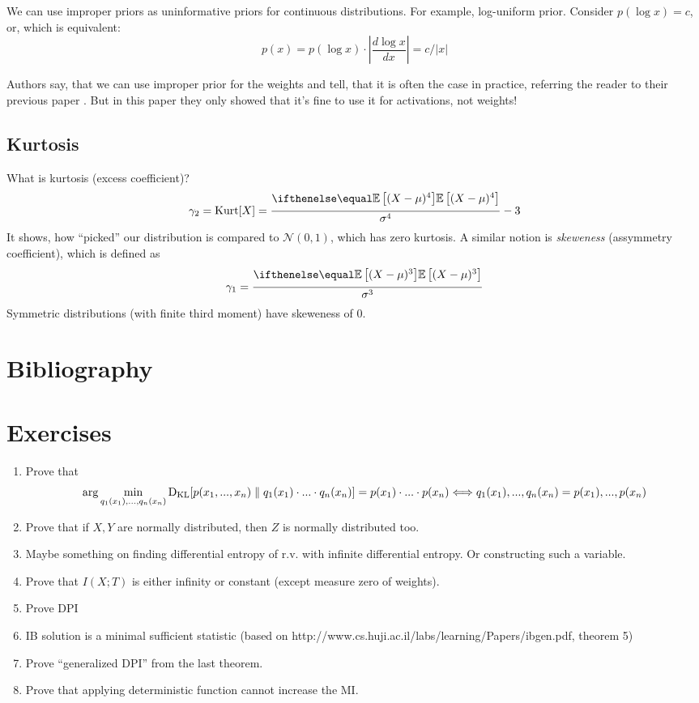 \documentclass{article}
\begin{document}
We can use improper priors as uninformative priors for continuous distributions.
For example, log-uniform prior.
Consider $p(\log x) = c$, or, which is equivalent:
\[
p(x) = p(\log x) \cdot \left|\frac{d\log x}{dx}\right| = c / |x|
\]

Authors say, that we can use improper prior for the weights and tell, that it is often the case in practice, referring the reader to their previous paper \cite{Information_Dropout}.
But in this paper they only showed that it's fine to use it for activations, not weights!

\subsection*{Kurtosis}
What is kurtosis (excess coefficient)?
\[
\gamma_2 = \text{Kurt}[X] = \frac{\expect{(X - \mu)^4}}{\sigma^4} - 3
\]
It shows, how ``picked'' our distribution is compared to $\mathcal{N}(0,1)$, which has zero kurtosis.
A similar notion is \textit{skeweness} (assymmetry coefficient), which is defined as
\[
\gamma_1 = \frac{\expect{(X - \mu)^3}}{\sigma^3}
\]
Symmetric distributions (with finite third moment) have skeweness of 0.


\section{Bibliography}
\printbibliography

\section*{Exercises}
\begin{enumerate}
    \item Prove that
\[
\arg \min_{q_1(x_1) , ... , q_n(x_n)} \text{D}_\text{KL}[p(x_1, ..., x_n) \parallel q_1(x_1) \cdot ... \cdot q_n(x_n)] = p(x_1) \cdot ... \cdot p(x_n) \Longleftrightarrow q_1(x_1) , ... , q_n(x_n) = p(x_1), ..., p(x_n)
\]
    \item Prove that if $X, Y$ are normally distributed, then $Z$ is normally distributed too. %
    \item Maybe something on finding differential entropy of r.v. with infinite differential entropy. Or constructing such a variable.
    \item Prove that $I(X;T)$ is either infinity or constant (except measure zero of weights).
    \item Prove DPI
    \item IB solution is a minimal sufficient statistic (based on http://www.cs.huji.ac.il/labs/learning/Papers/ibgen.pdf, theorem 5)
    \item Prove ``generalized DPI'' from the last theorem.
    \item Prove that applying deterministic function cannot increase the MI.
\end{enumerate}
\end{document}
